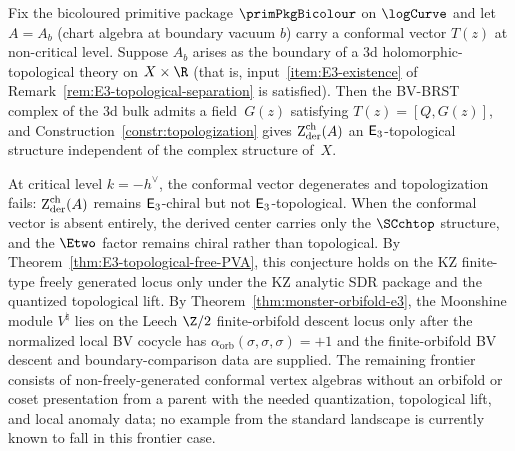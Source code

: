 \begin{conjecture}
\label{conj:E3-topological-general}
Fix the bicoloured primitive package $\primPkgBicolour$ on $\logCurve$
and let $A = A_b$ (chart algebra at boundary vacuum $b$) carry a
conformal vector $T(z)$ at non-critical level. Suppose $A_b$ arises
as the boundary of a $3$d holomorphic-topological theory on
$X \times \R$
\textup{(}that is, input~\textup{\ref{item:E3-existence}} of
Remark~\textup{\ref{rem:E3-topological-separation}} is
satisfied\textup{)}. Then the BV-BRST complex of the $3$d bulk
admits a field~$G(z)$ satisfying $T(z) = [Q, G(z)]$, and
Construction~\textup{\ref{constr:topologization}} gives
$\operatorname{Z}_{\mathrm{der}}^{\mathrm{ch}}(A)$ an $\mathsf{E}_3$-topological structure
independent of the complex structure of~$X$.

At critical level $k = -h^{\vee}$, the conformal vector
degenerates and topologization fails: $\operatorname{Z}_{\mathrm{der}}^{\mathrm{ch}}(A)$
remains $\mathsf{E}_3$-chiral but not $\mathsf{E}_3$-topological. When
the conformal vector is absent entirely, the derived center
carries only the $\SCchtop$ structure, and the $\Etwo$ factor
remains chiral rather than topological.
By Theorem~\ref{thm:E3-topological-free-PVA}, this conjecture holds on
the KZ finite-type freely generated locus only under the KZ analytic SDR
package and the quantized topological lift. By
Theorem~\ref{thm:monster-orbifold-e3}, the Moonshine module
$V^\natural$ lies on the Leech $\Z/2$ finite-orbifold descent locus only
after the normalized local BV cocycle has
$\alpha_{\mathrm{orb}}(\sigma,\sigma,\sigma)=+1$ and the
finite-orbifold BV descent and boundary-comparison data are supplied.
The remaining frontier consists of non-freely-generated conformal
vertex algebras without an orbifold or coset presentation from a parent
with the needed quantization, topological lift, and local anomaly data;
no example from the standard landscape is currently known to fall in
this frontier case.
\end{conjecture}


